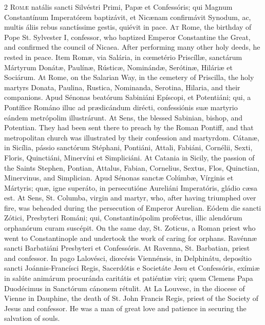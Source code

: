 \begin{paracol}{2}
\lettrine[lines=2]{R}{omæ} natális sancti Silvéstri Primi, Papæ et 
 Confessóris; qui Magnum Constantínum Imperatórem baptizávit, et Nicænam 
 confirmávit Synodum, ac, multis áliis rebus sanctíssime gestis, quiévit in 
 pace.
\switchcolumn
{}
\lettrine[lines=2]{A}{t} Rome, the birthday of Pope St. Sylvester I, confessor, who baptized 
 Emperor Constantine the Great, and confirmed the council of Nicaea. 
 After performing many other holy deeds, he rested in peace.
\switchcolumn*
{}
Item Romæ, via Salária, in cœmetério Priscíllæ, 
 sanctárum Mártyrum Donátæ, Paulínæ, Rústicæ, Nominándæ, Serótinæ, Hiláriæ et 
 Sociárum.
\switchcolumn
{}
At Rome, on the Salarian Way, in the cemetery of Priscilla, the holy martyrs 
 Donata, Paulina, Rustica, Nominanda, Serotina, Hilaria, and their 
 companions.
\switchcolumn*
{}
Apud Sénonas beatórum Sabiniáni Epíscopi, et 
 Potentiáni; qui, a Pontífice Románo illuc ad prædicándum dirécti, 
 confessiónis suæ martyrio eándem metrópolim illustrárunt.
\switchcolumn
{}
At Sens, the blessed Sabinian, bishop, and Potentian. They had been 
 sent there to preach by the Roman Pontiff, and that metropolitan church was 
 illustrated by their confession and martyrdom.
\switchcolumn*
{}
Cátanæ, in Sicília, pássio sanctórum Stéphani, 
 Pontiáni, Attali, Fabiáni, Cornélii, Sexti, Floris, Quinctiáni, Minervíni et 
 Simpliciáni.
\switchcolumn
{}
At Catania in Sicily, the passion of the Saints Stephen, Pontian, Attalus, 
 Fabian, Cornelius, Sextus, Flos, Quinctian, Minervinus, and Simplician.
\switchcolumn*
{}
Apud Sénonas sanctæ Colúmbæ, Vírginis et 
 Mártyris; quæ, igne superáto, in persecutióne Aureliáni Imperatóris, gládio 
 cæsa est.
\switchcolumn
{}
At Sens, St. Columba, virgin and martyr, who, after having triumphed over 
 fire, was beheaded during the persecution of Emperor Aurelian.
\switchcolumn*
{}
Eódem die sancti Zótici, Presbyteri Románi; 
 qui, Constantinópolim proféctus, illic alendórum orphanórum curam suscépit.
\switchcolumn
{}
On the same day, St. Zoticus, a Roman priest who went to Constantinople and 
 undertook the work of caring for orphans.
\switchcolumn*
{}
Ravénnæ sancti Barbatiáni Presbyteri et 
 Confessóris.
\switchcolumn
{}
At Ravenna, St. Barbatian, priest and confessor.
\switchcolumn*
{}
In pago Lalovésci, diœcésis Viennénsis, in Delphinátu, deposítio sancti
Joánnis-Francísci Regis, Sacerdótis e Societáte Jesu et Confessóris, exímiæ in
salúte animárum procuránda caritátis et patiéntiæ viri; quem Clemens Papa
Duodécimus in Sanctórum cánonem rétulit.
\switchcolumn
{}
At La Louvesc, in the diocese of Vienne in Dauphine, the death of St. John 
 Francis Regis, priest of the Society of Jesus and confessor. He was a 
 man of great love and patience in securing the salvation of souls.
\switchcolumn*
{}


\end{paracol}
